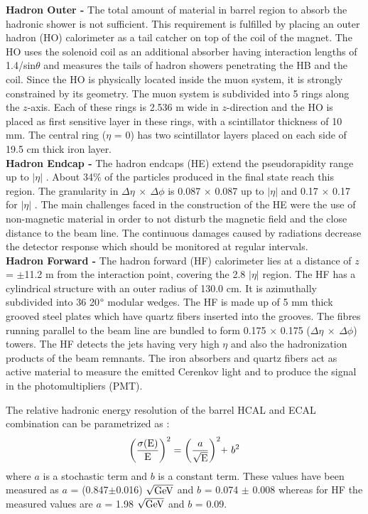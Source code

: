 {\bf Hadron Outer -} The total amount of material in barrel region to absorb the hadronic shower is not sufficient. This requirement is fulfilled by placing an outer hadron (HO) calorimeter as a tail catcher on top of the coil of the magnet. The HO uses the solenoid coil as an additional absorber having interaction lengths of 1.4/sin$\theta$ and measures the tails of hadron showers penetrating the HB and the coil. Since the HO is physically located inside the muon system, it is strongly constrained by its geometry. The muon system is subdivided into 5 rings along the $z$-axis. Each of these rings is 2.536 m wide in $z$-direction and the HO is placed as first sensitive layer in these rings, with a scintillator thickness of 10 mm. The central ring ($\eta$ = 0) has two scintillator layers placed on each side of 19.5 cm thick iron layer.\\ \newline
{\bf Hadron Endcap -} The hadron endcaps (HE) extend the pseudorapidity range up to $|\eta|$ . About 34\% of the particles produced in the final state reach this region. The granularity in $\Delta\eta~\times~\Delta\phi$ is 0.087 $\times$ 0.087 up to $|\eta|$  and 0.17 $\times$ 0.17 for $|\eta|$ . The main challenges faced in the construction of the HE were the use of non-magnetic material in order to not disturb the magnetic field and the close distance to the beam line. The continuous damages caused by radiations decrease the detector response which should be monitored at regular intervals. \\ \newline
{\bf Hadron Forward -} The hadron forward (HF) calorimeter lies at a distance of $z$ = $\pm$11.2 m from the interaction point, covering the 2.8 \ls $|\eta|$  region. The HF has a cylindrical structure with an outer radius of 130.0 cm. It is azimuthally subdivided into 36 20$\degree$ modular wedges. The HF is made up of 5 mm thick grooved steel plates which have quartz fibers inserted into the grooves. The fibres running parallel to the beam line are bundled to form 0.175 $\times$ 0.175 ($\Delta\eta~\times~\Delta\phi$) towers. The HF detects the jets having very high $\eta$ and also the hadronization products of the beam remnants. The iron absorbers and quartz fibers act as active material to measure the emitted Cerenkov light and to produce the signal in the photomultipliers (PMT).

The relative hadronic energy resolution of the barrel HCAL and ECAL combination can be parametrized as :
\begin{equation}
{\rm \bigg(\frac{\sigma(E)}{E}\bigg)^2} = \bigg(\frac{a}{\sqrt{\rm E}}\bigg)^2 \plus b^2
\end{equation}
where $a$ is a stochastic term and $b$ is a constant term. These values have been measured \cite{Chatrchyan:2009ag} as $a$ = (0.847$\pm$0.016) $\sqrt{\rm GeV}$ and $b$ = 0.074 $\pm$ 0.008 whereas for HF the measured values are $a$ = 1.98 $\sqrt{\rm GeV}$ and $b$ = 0.09.

